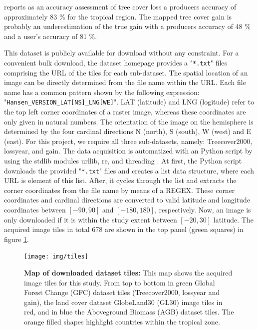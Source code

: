 			\citeauthor{Hansen2013} reports as an accuracy assessment of tree cover loss a producers accuracy of approximately 83 \% for the tropical region. The mapped tree cover gain is probably an underestimation of the true gain with a producers accuracy of 48 \% and a user's accuracy of 81 \%. 

			This dataset is publicly available for download without any constraint. For a convenient bulk download, the dataset homepage provides a "\verb|*.txt|" files comprising the \ac{URL} of the tiles for each sub-dataset. The spatial location of an image can be directly determined from the file name within the \ac{URL}. Each file name has a common pattern shown by the following expression: "\verb|Hansen_VERSION_LAT[NS]_LNG[WE]|". LAT (latitude) and LNG (logitude) refer to the top left corner coordinates of a raster image, whereas these coordinates are only given in natural numbers. The orientation of the image on the hemisphere is determined by the four cardinal directions N (north), S (south), W (west) and E (east). For this project, we require all three sub-datasets, namely: Treecover2000, lossyear, and gain. The data acquisition is automatized with an Python script by using the \ac{stdlib} modules urllib, re, and threading \citep{Rossum2018}. At first, the Python script downloads the provided "\verb|*.txt|" files and creates a list data structure, where each \ac{URL} is element of this list. After, it cycles through the list and extracts the corner coordinates from the file name by means of a \ac{REGEX}. These corner coordinates and cardinal directions are converted to valid latitude and longitude coordinates between $[-90, 90]$ and $[-180, 180]$, respectively. Now, an image is only downloaded if it is within the study extent between $[-20, 30]$ latitude. The acquired image tiles in total 678 are shown in the top panel (green squares) in figure \ref{fig:tiles}. 
			\begin{figure}[ht]
				\centering
				\texttt{[image: img/tiles]}
				\caption[Map of downloaded dataset tiles]{\textbf{Map of downloaded dataset tiles:} This map shows the acquired image tiles for this study. From top to bottom in green Global Forest Change (GFC) dataset tiles (Treecover2000, lossyear and gain), the land cover dataset GlobeLand30 (GL30) image tiles in red, and in blue the Aboveground Biomass (AGB) dataset tiles. The orange filled shapes highlight countries within the tropical zone.}
				\label{fig:tiles}
			\end{figure}

